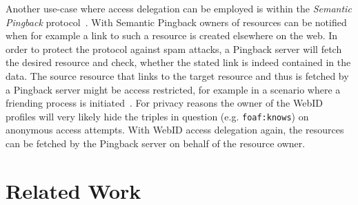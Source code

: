 \documentclass[a4paper]{llncs}
\begin{document}
Another use-case where access delegation can be employed is within the \textit{Semantic Pingback} protocol~\cite{tramp-s-2010--b}.
With Semantic Pingback owners of resources can be notified when for example a link to such a resource is created elsewhere on the web.
In order to protect the protocol against spam attacks, a Pingback server will fetch the desired resource and check, whether the stated link is indeed contained in the data.
The source resource that links to the target resource and thus is fetched by a Pingback server might be access restricted, for example in a scenario where a friending process is initiated~\cite{story-h-2011--a}.
For privacy reasons the owner of the WebID profiles will very likely hide the triples in question (e.g. \texttt{foaf:knows}) on anonymous access attempts.
With WebID access delegation again, the resources can be fetched by the Pingback server on behalf of the resource owner.

\section{Related Work}\label{sec:relatedwork}

\end{document}
